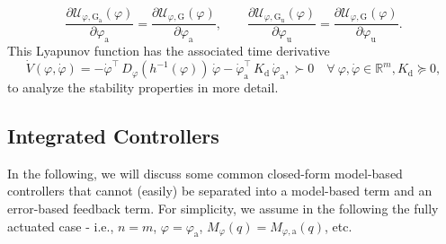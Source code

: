 \begin{equation}
    \frac{\partial \mathcal{U}_{\varphi,\mathrm{G}_\mathrm{a}}(\varphi)}{\partial \varphi_\mathrm{a}} = \frac{\partial \mathcal{U}_{\varphi,\mathrm{G}}(\varphi)}{\partial \varphi_\mathrm{a}},
    \qquad
    \frac{\partial \mathcal{U}_{\varphi,\mathrm{G}_\mathrm{u}}(\varphi)}{\partial \varphi_\mathrm{u}} = \frac{\partial \mathcal{U}_{\varphi,\mathrm{G}}(\varphi)}{\partial \varphi_\mathrm{u}}.
\end{equation}
This Lyapunov function has the associated time derivative
\begin{equation}
    \dot{V}(\varphi,\dot{\varphi}) = -\dot{\varphi}^\top \, D_\varphi(h^{-1}(\varphi)) \, \dot{\varphi} - \dot{\varphi}_\mathrm{a}^\top \, K_\mathrm{d} \, \dot{\varphi}_\mathrm{a}, \succ 0 \quad \forall \: \varphi,\dot{\varphi} \in \mathbb{R}^{m}, K_\mathrm{d} \succeq 0,
\end{equation}
to analyze the stability properties in more detail.

\subsection{Integrated Controllers}\label{sub:background:model_based_control:integrated_controllers}
In the following, we will discuss some common closed-form model-based controllers that cannot (easily) be separated into a model-based term and an error-based feedback term.
For simplicity, we assume in the following the fully actuated case - i.e., $n=m$, $\varphi = \varphi_\mathrm{a}$, $M_{\varphi}(q) = M_{\varphi,\mathrm{a}}(q)$, etc.

